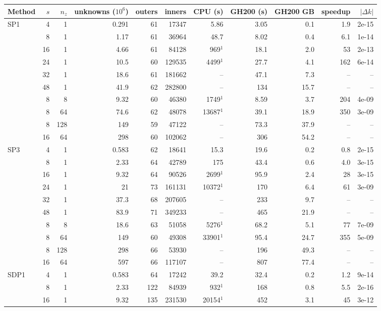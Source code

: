 \begin{tabular}{lrrrrrrrrrr}
\hline
Method & $s$ & $n_z$ & unknowns ($10^6$) & outers & inners & CPU (s) & GH200 (s) & GH200 GB & speedup & $|\Delta k|$ \\
\hline
SP1 & 4 & 1 & 0.291 & 61 & 17347 & 5.86 & 3.05 & 0.1 & 1.9 & 2e-15 \\
 & 8 & 1 & 1.17 & 61 & 36964 & 48.7 & 8.02 & 0.4 & 6.1 & 1e-14 \\
 & 16 & 1 & 4.66 & 61 & 84128 & 969$^1$ & 18.1 & 2.0 & 53 & 2e-13 \\
 & 24 & 1 & 10.5 & 60 & 129535 & 4499$^1$ & 27.7 & 4.1 & 162 & 6e-14 \\
 & 32 & 1 & 18.6 & 61 & 181662 & -- & 47.1 & 7.3 & -- & -- \\
 & 48 & 1 & 41.9 & 62 & 282800 & -- & 134 & 15.7 & -- & -- \\
 & 8 & 8 & 9.32 & 60 & 46380 & 1749$^1$ & 8.59 & 3.7 & 204 & 4e-09 \\
 & 8 & 64 & 74.6 & 62 & 48078 & 13687$^1$ & 39.1 & 18.9 & 350 & 3e-09 \\
 & 8 & 128 & 149 & 59 & 47122 & -- & 73.3 & 37.9 & -- & -- \\
 & 16 & 64 & 298 & 60 & 102062 & -- & 306 & 54.2 & -- & -- \\
SP3 & 4 & 1 & 0.583 & 62 & 18641 & 15.3 & 19.6 & 0.2 & 0.8 & 2e-15 \\
 & 8 & 1 & 2.33 & 64 & 42789 & 175 & 43.4 & 0.6 & 4.0 & 3e-15 \\
 & 16 & 1 & 9.32 & 64 & 90526 & 2699$^1$ & 95.9 & 2.4 & 28 & 3e-15 \\
 & 24 & 1 & 21 & 73 & 161131 & 10372$^1$ & 170 & 6.4 & 61 & 3e-09 \\
 & 32 & 1 & 37.3 & 68 & 207605 & -- & 233 & 9.7 & -- & -- \\
 & 48 & 1 & 83.9 & 71 & 349233 & -- & 465 & 21.9 & -- & -- \\
 & 8 & 8 & 18.6 & 63 & 51058 & 5276$^1$ & 68.2 & 5.1 & 77 & 7e-09 \\
 & 8 & 64 & 149 & 60 & 49308 & 33901$^1$ & 95.4 & 24.7 & 355 & 5e-09 \\
 & 8 & 128 & 298 & 66 & 53930 & -- & 196 & 49.3 & -- & -- \\
 & 16 & 64 & 597 & 66 & 117107 & -- & 807 & 77.4 & -- & -- \\
SDP1 & 4 & 1 & 0.583 & 64 & 17242 & 39.2 & 32.4 & 0.2 & 1.2 & 9e-14 \\
 & 8 & 1 & 2.33 & 122 & 84939 & 932$^1$ & 168 & 0.8 & 5.5 & 2e-16 \\
 & 16 & 1 & 9.32 & 135 & 231530 & 20154$^1$ & 452 & 3.1 & 45 & 3e-12 \\

\end{tabular}
